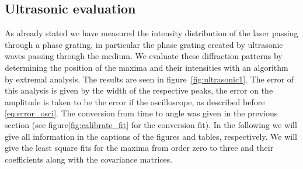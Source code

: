 \clearpage
\subsection{Ultrasonic evaluation}
As already stated we have measured the intensity distribution of the laser
passing through a phase grating, in particular the phase grating created
by ultrasonic waves passing through the medium. We evaluate these diffraction patterns
by determining the position of the maxima and their intensities with an algorithm
by extremal analysis. The results are seen in 
figure~\ref{fig:ultrasonic1}.
The error of this analysis
is given by the width of the respective peaks, the error on the amplitude is 
taken to be the error if the oscilloscope, as described before \eqref{eq:error_osci}.
The conversion from time to angle was given in the previous section (see
figure\ref{fig:calibrate_fit} for the conversion fit). In the following we 
will give all information in the captions of the figures and tables, respectively.
We will give the least square fits for the maxima from order zero to three and 
their coefficients along with the covariance matrices.

